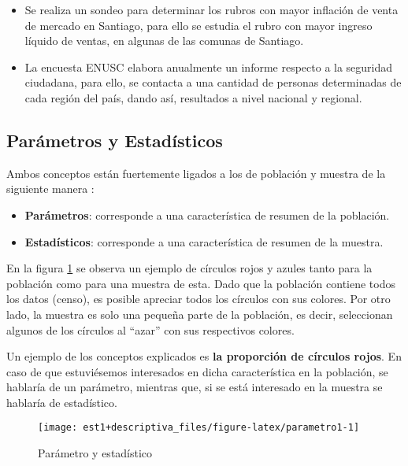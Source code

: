 \documentclass[
]{book}
\providecommand{\tightlist}{%
  \setlength{\itemsep}{0pt}\setlength{\parskip}{0pt}}
\theoremstyle{definition}
\theoremstyle{definition}
\theoremstyle{definition}
\theoremstyle{definition}
\theoremstyle{remark}
\begin{document}
\begin{itemize}
\tightlist
\item
  Se realiza un sondeo para determinar los rubros con mayor inflación de venta de mercado en Santiago, para ello se estudia el rubro con mayor ingreso líquido de ventas, en algunas de las comunas de Santiago.
\item
  La encuesta ENUSC elabora anualmente un informe respecto a la seguridad ciudadana, para ello, se contacta a una cantidad de personas determinadas de cada región del país, dando así, resultados a nivel nacional y regional.
\end{itemize}

\hypertarget{paruxe1metros-y-estaduxedsticos}{%
\subsection{Parámetros y Estadísticos}\label{paruxe1metros-y-estaduxedsticos}}

Ambos conceptos están fuertemente ligados a los de población y muestra de la siguiente manera \citep[página 83]{anderson}:

\begin{itemize}
\tightlist
\item
  \textbf{Parámetros}: corresponde a una característica de resumen de la población.
\item
  \textbf{Estadísticos}: corresponde a una característica de resumen de la muestra.
\end{itemize}

En la figura \ref{fig:parametro1} se observa un ejemplo de círculos rojos y azules tanto para la población como para una muestra de esta. Dado que la población contiene todos los datos (censo), es posible apreciar todos los círculos con sus colores. Por otro lado, la muestra es solo una pequeña parte de la población, es decir, seleccionan algunos de los círculos al ``azar'' con sus respectivos colores.

Un ejemplo de los conceptos explicados es \textbf{la proporción de círculos rojos}. En caso de que estuviésemos interesados en dicha característica en la población, se hablaría de un parámetro, mientras que, si se está interesado en la muestra se hablaría de estadístico.

\begin{figure}

{\centering \texttt{[image: est1+descriptiva\_files/figure-latex/parametro1-1]} 

}

\caption{Parámetro y estadístico}\label{fig:parametro1}
\end{figure}
\end{document}
